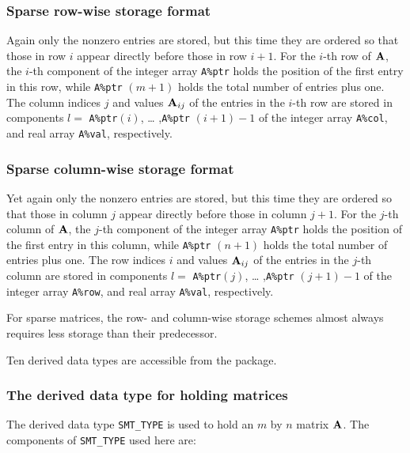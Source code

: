 \documentclass{galahad}
\begin{document}
\subsubsection{Sparse row-wise storage format}\label{rowwise}
Again only the nonzero entries are stored, but this time they are
ordered so that those in row $i$ appear directly before those in row
$i+1$. For the $i$-th row of ${\mathbf{A}}$, the $i$-th component of the integer
array {\tt A\%ptr} holds the position of the first entry in this row,
while {\tt A\%ptr} $(m+1)$ holds the total number of entries plus one.
The column indices $j$ and values ${\mathbf{A}}_{ij}$ of the entries in the
$i$-th row are stored in components $l =$ {\tt A\%ptr}$(i)$, \ldots
,{\tt A\%ptr} $(i+1)-1$ of the integer array {\tt A\%col}, and real
array {\tt A\%val}, respectively.

\subsubsection{Sparse column-wise storage format}\label{columnwise}
Yet again only the nonzero entries are stored, but this time they are
ordered so that those in column $j$ appear directly before those in column
$j+1$. For the $j$-th column of ${\mathbf{A}}$, the $j$-th component of the integer
array {\tt A\%ptr} holds the position of the first entry in this column,
while {\tt A\%ptr} $(n+1)$ holds the total number of entries plus one.
The row indices $i$ and values ${\mathbf{A}}_{ij}$ of the entries in the
$j$-th column are stored in components $l =$ {\tt A\%ptr}$(j)$, \ldots
,{\tt A\%ptr} $(j+1)-1$ of the integer array {\tt A\%row}, and real
array {\tt A\%val}, respectively.

For sparse matrices, the row- and column-wise storage schemes almost always
requires less storage than their predecessor.


\galtypes
Ten derived data types are accessible from the package.


\subsubsection{The derived data type for holding matrices}\label{typesmt}
The derived data type {\tt SMT\_TYPE} is used to hold an $m$ by $n$ 
matrix ${\mathbf{A}}$. The components of {\tt SMT\_TYPE} used here are:
\end{document}
